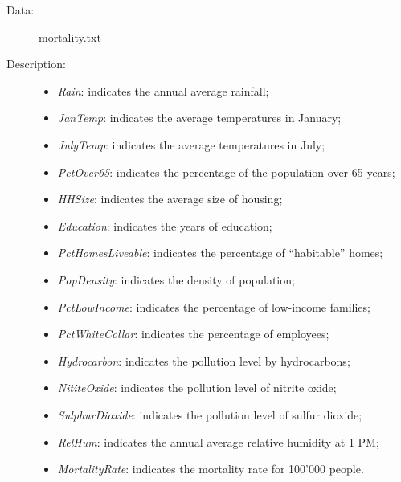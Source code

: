 \begin{frame}
  \begin{description}
    \item[Data: ]mortality.txt \\ 
    \item[Description: ]
      \begin{footnotesize}
        \begin{itemize}
          \item \textit{Rain}: indicates the annual average rainfall;
          \item \textit{JanTemp}: indicates the average temperatures in January;
          \item \textit{JulyTemp}: indicates the average temperatures in July;
          \item \textit{PctOver65}: indicates the percentage of the population over 65 years;
          \item \textit{HHSize}: indicates the average size of housing;
          \item \textit{Education}: indicates the years of education;
          \item \textit{PctHomesLiveable}: indicates the percentage of ``habitable'' homes;
          \item \textit{PopDensity}: indicates the density of population;
          \item \textit{PctLowIncome}: indicates the percentage of low-income families;
          \item \textit{PctWhiteCollar}: indicates the percentage of employees;
          \item \textit{Hydrocarbon}: indicates the pollution level by hydrocarbons;
          \item \textit{NititeOxide}: indicates the pollution level of nitrite oxide;
          \item \textit{SulphurDioxide}: indicates the pollution level of sulfur dioxide;
          \item \textit{RelHum}: indicates the annual average relative humidity at 1 PM;
          \item \textit{MortalityRate}: indicates the mortality rate for 100'000 people.
        \end{itemize}
      \end{footnotesize}
  \end{description}
\end{frame}

